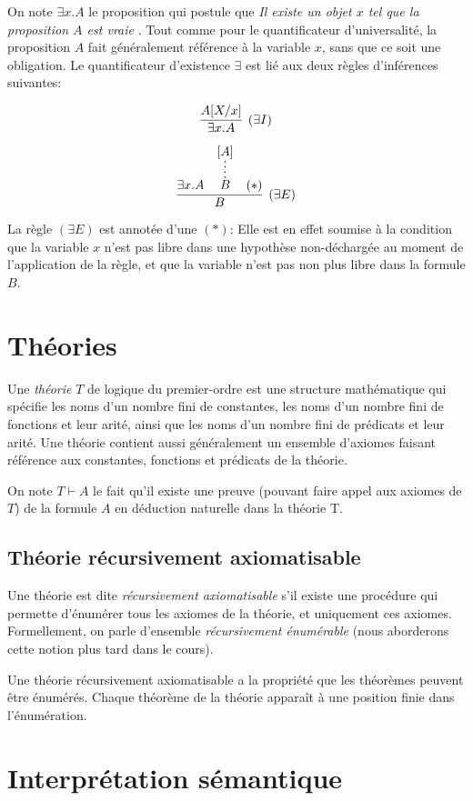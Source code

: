 On note $\exists x. A$ le proposition qui postule que \og \textit{Il existe un objet $x$ tel que la proposition $A$ est vraie} \fg{}.
Tout comme pour le quantificateur d'universalité, la proposition $A$ fait généralement référence à la variable $x$, sans que ce soit une obligation.
Le quantificateur d'existence $\exists$ est lié aux deux règles d'inférences suivantes:

\[
\infer[({\exists}I)]{\exists x. A}{A[X / x]}
\]

\[
\infer[({\exists}E)]{B}{\exists x. A & \infer*{B}{[A]} & (*)}
\]

La règle $({\exists}E)$ est annotée d'une $(*)$: Elle est en effet soumise à la condition que la variable $x$ n'est pas libre dans une hypothèse non-déchargée au moment de l'application de la règle, et que la variable n'est pas non plus libre dans la formule $B$.

\section{Théories}

Une \og \textit{théorie} \fg{} $T$ de logique du premier-ordre est une structure mathématique qui spécifie les noms d'un nombre fini de constantes, les noms d'un nombre fini de fonctions et leur arité, ainsi que les noms d'un nombre fini de prédicats et leur arité.
Une théorie contient aussi généralement un ensemble d'axiomes faisant référence aux constantes, fonctions et prédicats de la théorie.

On note $T \vdash A$ le fait qu'il existe une preuve (pouvant faire appel aux axiomes de $T$) de la formule $A$ en déduction naturelle dans la théorie T.

\subsection{Théorie récursivement axiomatisable}

Une théorie est dite \og \textit{récursivement axiomatisable} \fg{} s'il existe une procédure qui permette d'énumérer tous les axiomes de la théorie, et uniquement ces axiomes. Formellement, on parle d'ensemble \textit{récursivement énumérable} (nous aborderons cette notion plus tard dans le cours).

Une théorie récursivement axiomatisable a la propriété que les théorèmes peuvent être énumérés.
Chaque théorème de la théorie apparaît à une position finie dans l'énumération.

\section{Interprétation sémantique}

